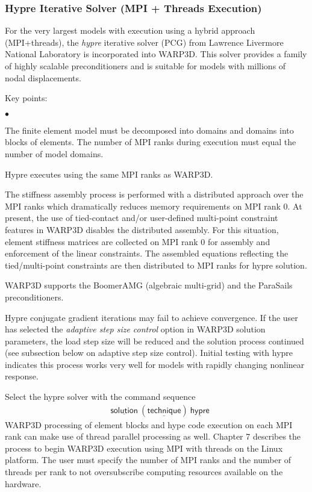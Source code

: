 \documentclass[11pt]{report}
\numberwithin{equation}{section}
\newcommand{\nin} {\noindent}
\newcommand{\ul} {\underline}
\newcommand{\hv} {\mathsf}   %
\newcommand{\ti}{\emph}
\newcommand{\squishlist}{
 \begin{list}{$\bullet$}
  { \setlength{\itemsep}{0pt}
     \setlength{\parsep}{3pt}
     \setlength{\topsep}{3pt}
     \setlength{\partopsep}{0pt}
     \setlength{\leftmargin}{1.5em}
     \setlength{\labelwidth}{1em}
     \setlength{\labelsep}{0.5em} } }
\newcommand{\squishend}{
  \end{list}  }
\begin{document}
\subsubsection{Hypre Iterative Solver  (MPI + Threads Execution)}
\nin
For the very largest models with execution using a hybrid approach
(MPI+threads), the \ti{hypre} iterative solver (PCG) from Lawrence Livermore
National Laboratory is incorporated into WARP3D. This solver provides a family
of highly scalable preconditioners and is
suitable for models with millions of nodal displacements. 

\nin Key points:
\small
\squishlist
\item The finite element model must be decomposed into domains and domains into
blocks of elements. The number of MPI ranks during execution
must equal the number of 
model domains.
\item Hypre executes using the same MPI ranks as WARP3D.
\item The stiffness assembly process is performed with a distributed approach
over the MPI ranks which dramatically reduces memory requirements on
MPI rank 0. At present, the use of  tied-contact and/or user-defined multi-point constraint 
features in WARP3D disables the distributed assembly. For this
situation, element stiffness
matrices are collected on MPI rank 0 for assembly and enforcement of the
linear constraints. The assembled equations reflecting the tied/multi-point
constraints are then distributed to MPI ranks for hypre solution.
\item WARP3D supports the BoomerAMG (algebraic multi-grid) and the
ParaSails preconditioners. 
\item Hypre conjugate gradient iterations may fail to achieve convergence. 
If the user has selected the \ti{adaptive step size control} option in 
WARP3D solution parameters, the load step size will be reduced and the
solution process continued (see subsection below on adaptive step size
control). Initial testing with hypre indicates this process works very
well for models with rapidly changing nonlinear response.
\squishend
\normalsize
Select the hypre solver with the command sequence
\begin{align*}
&\hv{\ul{solution}\ (\ul{technique})\ \ul{hypre}} 
\end{align*}
\nin WARP3D processing of element blocks and hype code execution on each
MPI rank can make use of thread parallel processing as well.  Chapter 7 describes the process
to begin WARP3D execution using MPI with threads on the Linux platform. 
The user must specify the number of MPI ranks and the number of threads per rank
to not oversubscribe computing resources available on the hardware.
\end{document}

